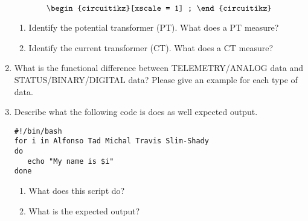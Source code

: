 \documentclass[12pt,letterpaper]{article}
\begin{document}
\begin{enumerate}[itemsep=50pt,parsep=2pt]
\begin{equation}
\begin{circuitikz}[xscale = 1]
;
\end{circuitikz}
    \end{equation}
\begin{enumerate}[itemsep=50pt,parsep=2pt]
    \item Identify the potential transformer (PT). What does a PT measure?
    \item Identify the current transformer (CT). What does a CT measure?
\end{enumerate}
\item
What is the functional difference between TELEMETRY/ANALOG data and STATUS/BINARY/DIGITAL data? Please give an example for each type of data.
\pagebreak
\item Describe what the following code is does as well expected output.
\begin{lstlisting}[style = Bash]
#!/bin/bash
for i in Alfonso Tad Michal Travis Slim-Shady
do
   echo "My name is $i"
done
    \end{lstlisting}
    \begin{enumerate} [itemsep=50pt,parsep=2pt]
        \item What does this script do?
        \item What is the expected output?
    \end{enumerate}
     

\end{enumerate}
\end{document}
